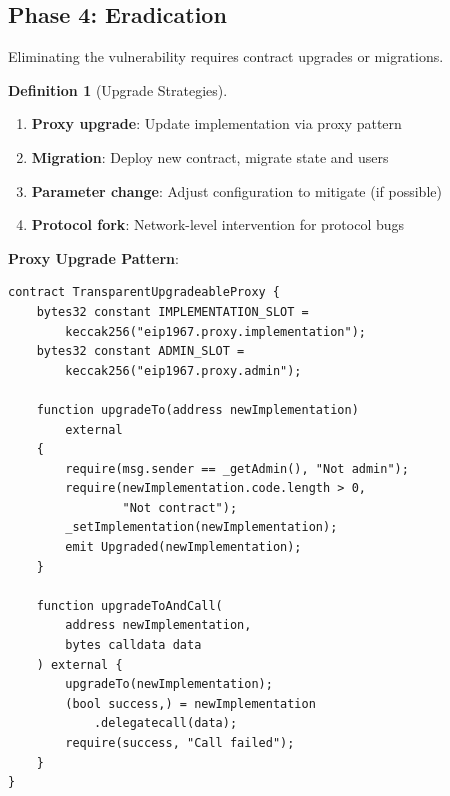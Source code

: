 \documentclass[11pt,a4paper]{article}
\theoremstyle{definition}
\newtheorem{definition}{Definition}
\begin{document}
\subsection{Phase 4: Eradication}

Eliminating the vulnerability requires contract upgrades or migrations.

\begin{definition}[Upgrade Strategies]
\begin{enumerate}
    \item \textbf{Proxy upgrade}: Update implementation via proxy pattern
    \item \textbf{Migration}: Deploy new contract, migrate state and users
    \item \textbf{Parameter change}: Adjust configuration to mitigate (if possible)
    \item \textbf{Protocol fork}: Network-level intervention for protocol bugs
\end{enumerate}
\end{definition}

\textbf{Proxy Upgrade Pattern}:
\begin{lstlisting}[language=Solidity,basicstyle=\ttfamily\small]
contract TransparentUpgradeableProxy {
    bytes32 constant IMPLEMENTATION_SLOT =
        keccak256("eip1967.proxy.implementation");
    bytes32 constant ADMIN_SLOT =
        keccak256("eip1967.proxy.admin");

    function upgradeTo(address newImplementation)
        external
    {
        require(msg.sender == _getAdmin(), "Not admin");
        require(newImplementation.code.length > 0,
                "Not contract");
        _setImplementation(newImplementation);
        emit Upgraded(newImplementation);
    }

    function upgradeToAndCall(
        address newImplementation,
        bytes calldata data
    ) external {
        upgradeTo(newImplementation);
        (bool success,) = newImplementation
            .delegatecall(data);
        require(success, "Call failed");
    }
}
\end{lstlisting}
\end{document}
